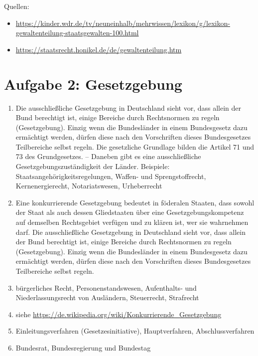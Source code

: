 \documentclass{article}
\begin{document}
	Quellen:
	\begin{itemize}
		\item \url{https://kinder.wdr.de/tv/neuneinhalb/mehrwissen/lexikon/g/lexikon-gewaltenteilung-staatsgewalten-100.html}
		\item \url{https://staatsrecht.honikel.de/de/gewaltenteilung.htm}
	\end{itemize}

	\section*{Aufgabe 2: Gesetzgebung}
	\begin{enumerate}[label=(\alph*)]
		\item Die ausschließliche Gesetzgebung in Deutschland sieht vor, dass allein der Bund berechtigt ist, einige Bereiche durch Rechtsnormen zu regeln (Gesetzgebung). Einzig wenn die Bundesländer in einem Bundesgesetz dazu ermächtigt werden, dürfen diese nach den Vorschriften dieses Bundesgesetzes Teilbereiche selbst regeln. Die gesetzliche Grundlage bilden die Artikel 71 und 73 des Grundgesetzes. – Daneben gibt es eine ausschließliche Gesetzgebungszuständigkeit der Länder. Beispiele: Staatsangehörigkeitsregelungen, Waffen- und Sprengstoffrecht, Kernenergierecht, Notariatswesen, Urheberrecht
		\item Eine konkurrierende Gesetzgebung bedeutet in föderalen Staaten, dass sowohl der Staat als auch dessen Gliedstaaten über eine Gesetzgebungskompetenz auf demselben Rechtsgebiet verfügen und zu klären ist, wer sie wahrnehmen darf. Die ausschließliche Gesetzgebung in Deutschland sieht vor, dass allein der Bund berechtigt ist, einige Bereiche durch Rechtsnormen zu regeln (Gesetzgebung). Einzig wenn die Bundesländer in einem Bundesgesetz dazu ermächtigt werden, dürfen diese nach den Vorschriften dieses Bundesgesetzes Teilbereiche selbst regeln.
		\item bürgerliches Recht, Personenstandswesen, Aufenthalts- und Niederlassungsrecht von Ausländern, Steuerrecht, Strafrecht
		\item siehe \url{https://de.wikipedia.org/wiki/Konkurrierende_Gesetzgebung}
		\item Einleitungsverfahren (Gesetzesinitiative), Hauptverfahren, Abschlussverfahren
		\item Bundesrat, Bundesregierung und Bundestag

\end{enumerate}
\end{document}
